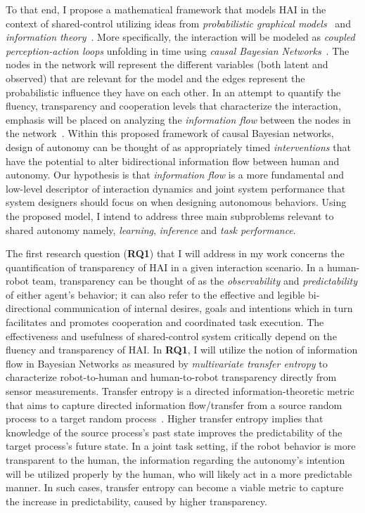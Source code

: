 \documentclass[12pt]{article}
\newcommand{\DGc}[1]{{\textbf{\color{blue}{#1}}}}
\begin{document}
To that end, I propose a mathematical framework that models HAI in the context of shared-control utilizing ideas from \textit{probabilistic graphical models}~\cite{koller2009probabilistic} and \textit{information theory}~\cite{cover2012elements}. More specifically, the interaction will be modeled as \textit{coupled perception-action loops} unfolding in time using \textit{causal Bayesian Networks}~\cite{pearl2009causality}. The nodes in the network will represent the different variables (both latent and observed) that are relevant for the model and the edges represent the probabilistic influence they have on each other. In an attempt to quantify the fluency, transparency and cooperation levels that characterize the interaction, emphasis will be placed on analyzing the \textit{information flow} between the nodes in the network~\cite{ay2008information}. Within this proposed framework of causal Bayesian networks, design of autonomy can be thought of as appropriately timed \textit{interventions} that have the potential to alter bidirectional information flow between human and autonomy.
Our hypothesis is that \textit{information flow} is a more fundamental and low-level descriptor of interaction dynamics and joint system performance that system designers should focus on when designing autonomous behaviors.
Using the proposed model, I intend to address three main subproblems relevant to shared autonomy namely, \textit{learning}, \textit{inference} and \textit{task performance}.

The first research question (\textbf{RQ1}) that I will address in my work concerns the quantification of transparency of HAI in a given interaction scenario. In a human-robot team, transparency can be thought of as the \textit{observability} and \textit{predictability} of either agent's behavior; it can also refer to the effective and legible bi-directional communication of internal desires, goals and intentions which in turn facilitates and promotes cooperation and coordinated task execution. The effectiveness and usefulness of shared-control system critically depend on the fluency and transparency of HAI. In \textbf{RQ1}, I will utilize the notion of information flow in Bayesian Networks as measured by \textit{multivariate transfer entropy} to characterize robot-to-human and human-to-robot transparency directly from sensor measurements.  Transfer entropy is a directed information-theoretic metric that aims to capture directed information flow/transfer from a source random process to a target random process~\cite{schreiber2000measuring}. Higher transfer entropy implies that knowledge of the source process's past state improves the predictability of the target process's future state. In a joint task setting, if the robot behavior is more transparent to the human, the information regarding the autonomy's intention will be utilized properly by the human, who will likely act in a more predictable manner. In such cases, transfer entropy can become a viable metric to capture the increase in predictability, caused by higher transparency. 
\end{document}
